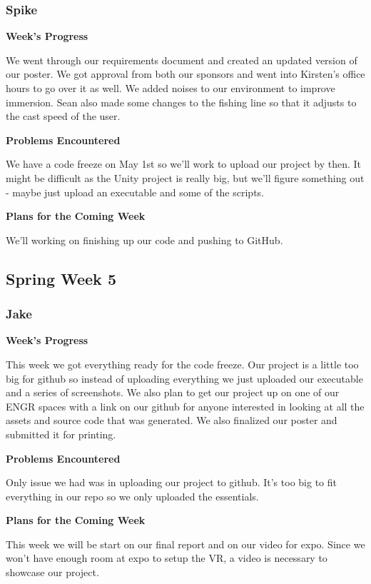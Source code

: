 \documentclass[10pt,journal,compsoc,onecolumn, draftclsnofoot]{IEEEtran}
\begin{document}
\subsubsection{Spike}
\noindent \textbf{Week's Progress}

We went through our requirements document and created an updated version of our poster. We got approval from both our sponsors and went into Kirsten's office hours to go over it as well. We added noises to our environment to improve immersion. Sean also made some changes to the fishing line so that it adjusts to the cast speed of the user.

\noindent \textbf{Problems Encountered}

We have a code freeze on May 1st so we'll work to upload our project by then. It might be difficult as the Unity project is really big, but we'll figure something out - maybe just upload an executable and some of the scripts.

\noindent \textbf{Plans for the Coming Week}

We'll working on finishing up our code and pushing to GitHub.

\subsection{Spring Week 5}
\subsubsection{Jake}
\noindent \textbf{Week's Progress}

This week we got everything ready for the code freeze. Our project is a little too big for github so instead of uploading everything we just uploaded our executable and a series of screenshots. We also plan to get our project up on one of our ENGR spaces with a link on our github for anyone interested in looking at all the assets and source code that was generated. We also finalized our poster and submitted it for printing.

\noindent \textbf{Problems Encountered}

Only issue we had was in uploading our project to github. It's too big to fit everything in our repo so we only uploaded the essentials.

\noindent \textbf{Plans for the Coming Week}

This week we will be start on our final report and on our video for expo. Since we won't have enough room at expo to setup the VR, a video is necessary to showcase our project.
\end{document}
